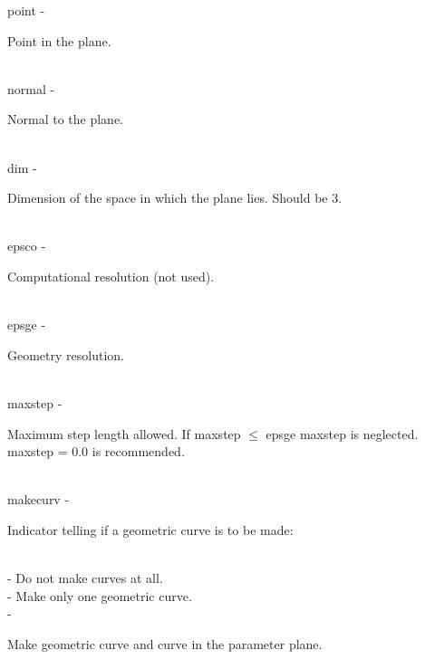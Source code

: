         \>\>    {\fov point}    \> - \> \begin{minipg2}
                                Point in the plane.
                                \end{minipg2}\\
        \>\>    {\fov normal}   \> - \> \begin{minipg2}
                                Normal to the plane.
                                \end{minipg2}\\
        \>\>    {\fov dim}      \> - \> \begin{minipg2}
                                Dimension of the space in which the plane lies.
                                Should be 3.
                                \end{minipg2} \\[0.8ex]
        \>\>    {\fov epsco}    \> - \> \begin{minipg2}
                                Computational resolution (not used).
                                \end{minipg2}\\
        \>\>    {\fov epsge}    \> - \> \begin{minipg2}
                                Geometry resolution.
                                \end{minipg2}\\
        \>\>    {\fov maxstep}  \> - \> \begin{minipg2}
                                Maximum step length allowed.
                                If maxstep $\leq$ epsge maxstep is
                                neglected. maxstep = 0.0 is recommended.
                                \end{minipg2}\\[0.8ex]
        \>\>    {\fov makecurv}\> - \>  \begin{minipg2}
                                Indicator telling if a geometric curve is to be made:
                                \end{minipg2}\\
                \>\>\>\> -     \>Do not make curves at all.\\
                \>\>\>\> -     \>Make only one geometric curve.\\
                \>\>\>\> -     \>\begin{minipg5}
                                        Make geometric curve and curve in the parameter
                                        plane.
                                        \end{minipg5} \\[0.3ex]
